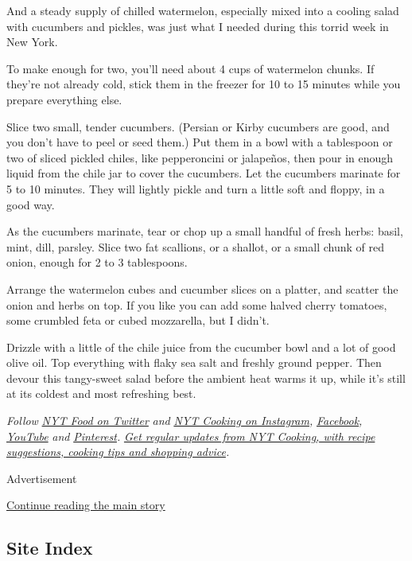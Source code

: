 And a steady supply of chilled watermelon, especially mixed into a
cooling salad with cucumbers and pickles, was just what I needed during
this torrid week in New York.

To make enough for two, you'll need about 4 cups of watermelon chunks.
If they're not already cold, stick them in the freezer for 10 to 15
minutes while you prepare everything else.

Slice two small, tender cucumbers. (Persian or Kirby cucumbers are good,
and you don't have to peel or seed them.) Put them in a bowl with a
tablespoon or two of sliced pickled chiles, like pepperoncini or
jalapeños, then pour in enough liquid from the chile jar to cover the
cucumbers. Let the cucumbers marinate for 5 to 10 minutes. They will
lightly pickle and turn a little soft and floppy, in a good way.

As the cucumbers marinate, tear or chop up a small handful of fresh
herbs: basil, mint, dill, parsley. Slice two fat scallions, or a
shallot, or a small chunk of red onion, enough for 2 to 3 tablespoons.

Arrange the watermelon cubes and cucumber slices on a platter, and
scatter the onion and herbs on top. If you like you can add some halved
cherry tomatoes, some crumbled feta or cubed mozzarella, but I didn't.

Drizzle with a little of the chile juice from the cucumber bowl and a
lot of good olive oil. Top everything with flaky sea salt and freshly
ground pepper. Then devour this tangy-sweet salad before the ambient
heat warms it up, while it's still at its coldest and most refreshing
best.

\emph{Follow} \href{https://twitter.com/nytfood}{\emph{NYT Food on
Twitter}} \emph{and}
\href{https://www.instagram.com/nytcooking/}{\emph{NYT Cooking on
Instagram}}\emph{,}
\href{https://www.facebook.com/nytcooking/}{\emph{Facebook}}\emph{,}
\href{https://www.youtube.com/nytcooking}{\emph{YouTube}} \emph{and}
\href{https://www.pinterest.com/nytcooking/}{\emph{Pinterest}}\emph{.}
\href{https://www.nytimes.com/newsletters/cooking}{\emph{Get regular
updates from NYT Cooking, with recipe suggestions, cooking tips and
shopping advice}}\emph{.}

Advertisement

\protect\hyperlink{after-bottom}{Continue reading the main story}

\hypertarget{site-index}{%
\subsection{Site Index}\label{site-index}}

